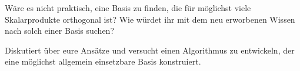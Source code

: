 \begin{centralquestion}
Wäre es nicht praktisch, eine Basis zu finden, die für möglichst viele Skalarprodukte orthogonal ist? Wie würdet ihr mit dem neu erworbenen Wissen nach solch einer Basis suchen?

Diskutiert über eure Ansätze und versucht einen Algorithmus zu entwickeln, der eine möglichst allgemein einsetzbare Basis konstruiert.
\end{centralquestion}

\pagebreak
